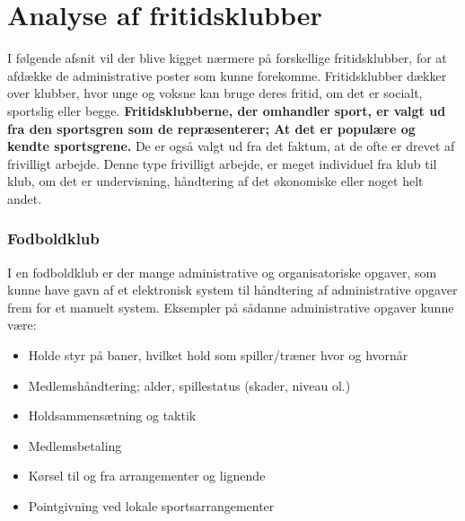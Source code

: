 \chapter{Analyse af fritidsklubber} \label{Fritidsklubber} 

I følgende afsnit vil der blive kigget nærmere på forskellige fritidsklubber, for at afdække de administrative poster som kunne
forekomme. Fritidsklubber dækker over klubber, hvor unge og voksne kan bruge deres fritid, om det er
socialt, sportslig eller begge. 
\textbf{Fritidsklubberne, der omhandler sport, er valgt ud fra den sportsgren som de
repræsenterer; At det er populære og kendte sportsgrene.}
De er også valgt ud fra det faktum, at de ofte er drevet af
frivilligt arbejde. Denne type frivilligt arbejde, er meget individuel fra klub til klub, om det er undervisning,
håndtering af det økonomiske eller noget helt andet. 

\subsection{Fodboldklub} \label{Fodbold}
I en fodboldklub er der mange administrative og organisatoriske opgaver, som kunne have gavn af et elektronisk system
til håndtering af administrative opgaver frem for et manuelt system. Eksempler på sådanne
administrative opgaver kunne være:

\begin{itemize}
\item Holde styr på baner, hvilket hold som spiller/træner hvor og hvornår
\item Medlemshåndtering; alder, spillestatus (skader, niveau ol.)
\item Holdsammensætning og taktik 
\item Medlemsbetaling
\item Kørsel til og fra arrangementer og lignende
\item Pointgivning ved lokale sportsarrangementer
\end{itemize}

